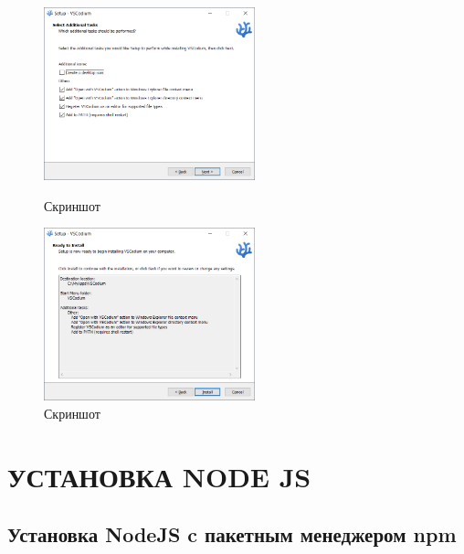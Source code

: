 \begin{figure}[!phtb]
    \centering

    \begin{minipage}{0.49\textwidth}
        \centering

        \includegraphics[height=5cm]
        {images/install/vs-codium/5.png}

        \caption{Скриншот}

        \label{fig:vscodium_5}
    \end{minipage}
    \begin{minipage}{0.49\textwidth}
        \centering

        \includegraphics[height=5cm]
        {images/install/vs-codium/6.png}

        \caption{Скриншот}

        \label{fig:vscodium_6}
    \end{minipage}
\end{figure}

\section{УСТАНОВКА NODE JS}

\subsection{Установка NodeJS c пакетным менеджером npm}

